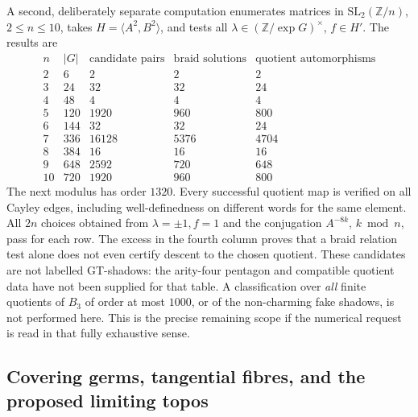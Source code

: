 A second, deliberately separate computation enumerates matrices in
$\mathrm{SL}_2(\mathbb Z/n)$, $2\leq n\leq10$, takes
$H=\langle A^2,B^2\rangle$, and tests all
$\lambda\in(\mathbb Z/\exp G)^\times$, $f\in H'$.  The results are
\[
\begin{array}{c|r|r|r|r}
 n&|G|&\text{candidate pairs}&\text{braid solutions}&
 \text{quotient automorphisms}\\\hline
 2&6&2&2&2\\3&24&32&32&24\\4&48&4&4&4\\
 5&120&1920&960&800\\6&144&32&32&24\\
 7&336&16128&5376&4704\\8&384&16&16&16\\
 9&648&2592&720&648\\10&720&1920&960&800
\end{array}
\]
The next modulus has order $1320$.  Every successful quotient map is
verified on all Cayley edges, including well-definedness on different
words for the same element.  All $2n$ choices obtained from
$\lambda=\pm1,f=1$ and the conjugation $A^{-8k}$, $k\bmod n$, pass
for each row.  The excess in the fourth column proves that a braid
relation test alone does not even certify descent to the chosen
quotient.  These candidates are not labelled GT-shadows: the
arity-four pentagon and compatible quotient data have not been
supplied for that table.  A classification over \emph{all} finite
quotients of $B_3$ of order at most $1000$, or of the non-charming
fake shadows, is not performed here.  This is the precise remaining
scope if the numerical request is read in that fully exhaustive sense.

\subsection{Covering germs, tangential fibres, and the proposed limiting topos}

